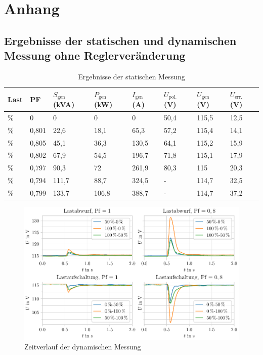 \chapter{Anhang}
\label{chap:Anhang}
\section{Ergebnisse der statischen und dynamischen Messung ohne Reglerveränderung}

\begin{longtable}[]{llllllll}
\caption{Ergebnisse der statischen Messung}
\tabularnewline
\toprule
Last  & PF    & $S_{\mathrm{gen}}$ (kVA) & $P_{\mathrm{gen}}$ (kW) & $I_{\mathrm{gen}}$ (A) & $U_{\mathrm{pol.}}$ (V) & $U_{\mathrm{gen}}$ (V) & $U_{\mathrm{err.}}$ (V) \\ 
\midrule
\endhead
\unit[0]{\%}   & 0     & 0          & 0         & 0        & 50,4      & 115,5    & 12,5      \\
\unit[25]{\%}  & 0,801 & 22,6       & 18,1      & 65,3     & 57,2      & 115,4    & 14,1      \\
\unit[50]{\%}  & 0,805 & 45,1       & 36,3      & 130,5    & 64,1      & 115,2    & 15,9      \\
\unit[75]{\%}  & 0,802 & 67,9       & 54,5      & 196,7    & 71,8      & 115,1    & 17,9      \\
\unit[100]{\%} & 0,797 & 90,3       & 72        & 261,9    & 80,3      & 115      & 20,3      \\
\unit[125]{\%} & 0,794 & 111,7      & 88,7      & 324,5    & -         & 114,7    & 32,5      \\
\unit[150]{\%} & 0,799 & 133,7      & 106,8     & 388,7    & -         & 114,7    & 37,2      \\ \bottomrule
\end{longtable}

\begin{figure}
	\centering
	\includegraphics{Bilder/DynamischeMessung.pdf}
	\caption{Zeitverlauf der dynamischen Messung}
	\label{fig:ZeitverlaufDynamischOhneRegleraenderung}
\end{figure}

